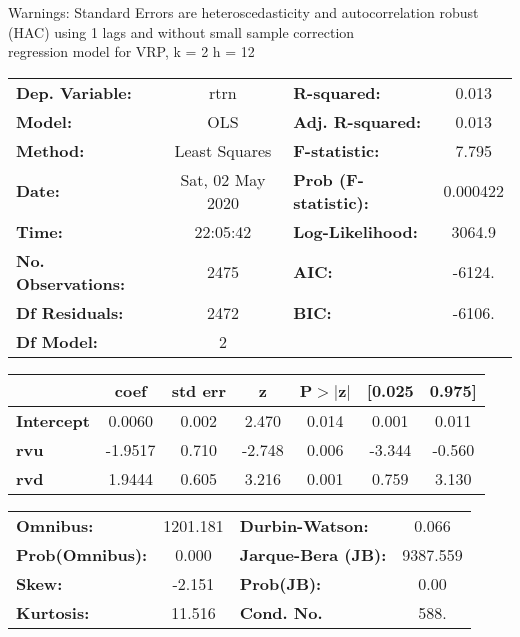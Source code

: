 Warnings: \newline
 [1] Standard Errors are heteroscedasticity and autocorrelation robust (HAC) using 1 lags and without small sample correction\\ 

regression model for VRP, k = 2 h = 12\begin{center}
\begin{tabular}{lclc}
\toprule
\textbf{Dep. Variable:}    &       rtrn       & \textbf{  R-squared:         } &     0.013   \\
\textbf{Model:}            &       OLS        & \textbf{  Adj. R-squared:    } &     0.013   \\
\textbf{Method:}           &  Least Squares   & \textbf{  F-statistic:       } &     7.795   \\
\textbf{Date:}             & Sat, 02 May 2020 & \textbf{  Prob (F-statistic):} &  0.000422   \\
\textbf{Time:}             &     22:05:42     & \textbf{  Log-Likelihood:    } &    3064.9   \\
\textbf{No. Observations:} &        2475      & \textbf{  AIC:               } &    -6124.   \\
\textbf{Df Residuals:}     &        2472      & \textbf{  BIC:               } &    -6106.   \\
\textbf{Df Model:}         &           2      & \textbf{                     } &             \\
\bottomrule
\end{tabular}
\begin{tabular}{lcccccc}
                   & \textbf{coef} & \textbf{std err} & \textbf{z} & \textbf{P$> |$z$|$} & \textbf{[0.025} & \textbf{0.975]}  \\
\midrule
\textbf{Intercept} &       0.0060  &        0.002     &     2.470  &         0.014        &        0.001    &        0.011     \\
\textbf{rvu}       &      -1.9517  &        0.710     &    -2.748  &         0.006        &       -3.344    &       -0.560     \\
\textbf{rvd}       &       1.9444  &        0.605     &     3.216  &         0.001        &        0.759    &        3.130     \\
\bottomrule
\end{tabular}
\begin{tabular}{lclc}
\textbf{Omnibus:}       & 1201.181 & \textbf{  Durbin-Watson:     } &    0.066  \\
\textbf{Prob(Omnibus):} &   0.000  & \textbf{  Jarque-Bera (JB):  } & 9387.559  \\
\textbf{Skew:}          &  -2.151  & \textbf{  Prob(JB):          } &     0.00  \\
\textbf{Kurtosis:}      &  11.516  & \textbf{  Cond. No.          } &     588.  \\
\bottomrule
\end{tabular}
\end{center}

